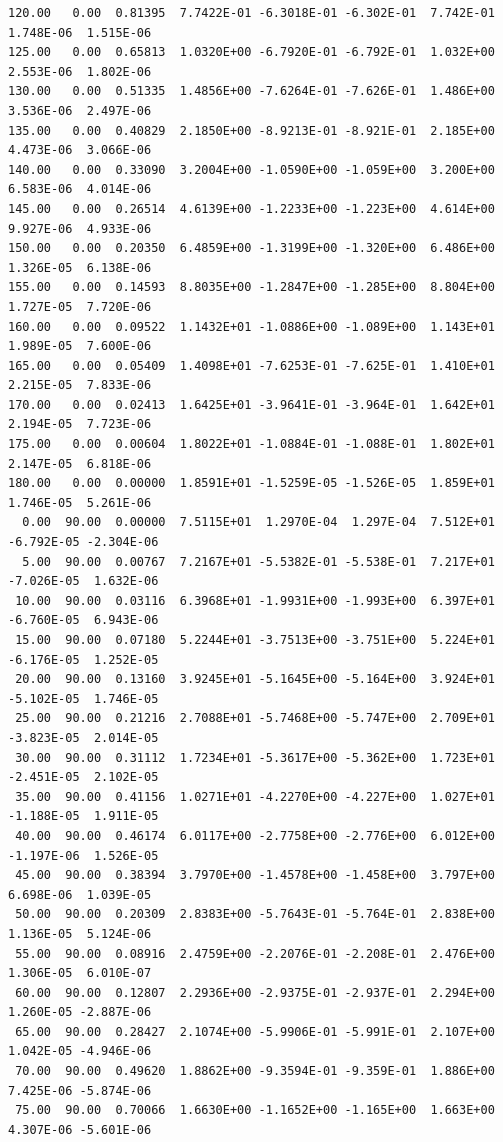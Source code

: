 \begin{appendix}
{\begin{verbatim}
120.00   0.00  0.81395  7.7422E-01 -6.3018E-01 -6.302E-01  7.742E-01  1.748E-06  1.515E-06
125.00   0.00  0.65813  1.0320E+00 -6.7920E-01 -6.792E-01  1.032E+00  2.553E-06  1.802E-06
130.00   0.00  0.51335  1.4856E+00 -7.6264E-01 -7.626E-01  1.486E+00  3.536E-06  2.497E-06
135.00   0.00  0.40829  2.1850E+00 -8.9213E-01 -8.921E-01  2.185E+00  4.473E-06  3.066E-06
140.00   0.00  0.33090  3.2004E+00 -1.0590E+00 -1.059E+00  3.200E+00  6.583E-06  4.014E-06
145.00   0.00  0.26514  4.6139E+00 -1.2233E+00 -1.223E+00  4.614E+00  9.927E-06  4.933E-06
150.00   0.00  0.20350  6.4859E+00 -1.3199E+00 -1.320E+00  6.486E+00  1.326E-05  6.138E-06
155.00   0.00  0.14593  8.8035E+00 -1.2847E+00 -1.285E+00  8.804E+00  1.727E-05  7.720E-06
160.00   0.00  0.09522  1.1432E+01 -1.0886E+00 -1.089E+00  1.143E+01  1.989E-05  7.600E-06
165.00   0.00  0.05409  1.4098E+01 -7.6253E-01 -7.625E-01  1.410E+01  2.215E-05  7.833E-06
170.00   0.00  0.02413  1.6425E+01 -3.9641E-01 -3.964E-01  1.642E+01  2.194E-05  7.723E-06
175.00   0.00  0.00604  1.8022E+01 -1.0884E-01 -1.088E-01  1.802E+01  2.147E-05  6.818E-06
180.00   0.00  0.00000  1.8591E+01 -1.5259E-05 -1.526E-05  1.859E+01  1.746E-05  5.261E-06
  0.00  90.00  0.00000  7.5115E+01  1.2970E-04  1.297E-04  7.512E+01 -6.792E-05 -2.304E-06
  5.00  90.00  0.00767  7.2167E+01 -5.5382E-01 -5.538E-01  7.217E+01 -7.026E-05  1.632E-06
 10.00  90.00  0.03116  6.3968E+01 -1.9931E+00 -1.993E+00  6.397E+01 -6.760E-05  6.943E-06
 15.00  90.00  0.07180  5.2244E+01 -3.7513E+00 -3.751E+00  5.224E+01 -6.176E-05  1.252E-05
 20.00  90.00  0.13160  3.9245E+01 -5.1645E+00 -5.164E+00  3.924E+01 -5.102E-05  1.746E-05
 25.00  90.00  0.21216  2.7088E+01 -5.7468E+00 -5.747E+00  2.709E+01 -3.823E-05  2.014E-05
 30.00  90.00  0.31112  1.7234E+01 -5.3617E+00 -5.362E+00  1.723E+01 -2.451E-05  2.102E-05
 35.00  90.00  0.41156  1.0271E+01 -4.2270E+00 -4.227E+00  1.027E+01 -1.188E-05  1.911E-05
 40.00  90.00  0.46174  6.0117E+00 -2.7758E+00 -2.776E+00  6.012E+00 -1.197E-06  1.526E-05
 45.00  90.00  0.38394  3.7970E+00 -1.4578E+00 -1.458E+00  3.797E+00  6.698E-06  1.039E-05
 50.00  90.00  0.20309  2.8383E+00 -5.7643E-01 -5.764E-01  2.838E+00  1.136E-05  5.124E-06
 55.00  90.00  0.08916  2.4759E+00 -2.2076E-01 -2.208E-01  2.476E+00  1.306E-05  6.010E-07
 60.00  90.00  0.12807  2.2936E+00 -2.9375E-01 -2.937E-01  2.294E+00  1.260E-05 -2.887E-06
 65.00  90.00  0.28427  2.1074E+00 -5.9906E-01 -5.991E-01  2.107E+00  1.042E-05 -4.946E-06
 70.00  90.00  0.49620  1.8862E+00 -9.3594E-01 -9.359E-01  1.886E+00  7.425E-06 -5.874E-06
 75.00  90.00  0.70066  1.6630E+00 -1.1652E+00 -1.165E+00  1.663E+00  4.307E-06 -5.601E-06

\end{verbatim}}
\end{appendix}
